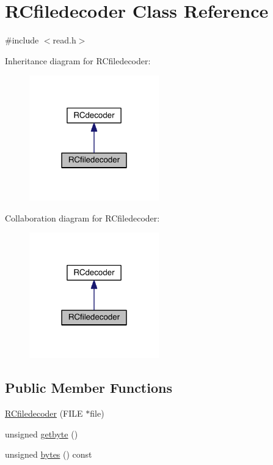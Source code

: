 \hypertarget{class_r_cfiledecoder}{}\section{R\+Cfiledecoder Class Reference}
\label{class_r_cfiledecoder}


{\ttfamily \#include $<$read.\+h$>$}



Inheritance diagram for R\+Cfiledecoder\+:\nopagebreak
\begin{figure}[H]
\begin{center}
\leavevmode
\includegraphics[width=159pt]{d4/dab/class_r_cfiledecoder__inherit__graph}
\end{center}
\end{figure}


Collaboration diagram for R\+Cfiledecoder\+:\nopagebreak
\begin{figure}[H]
\begin{center}
\leavevmode
\includegraphics[width=159pt]{d5/d83/class_r_cfiledecoder__coll__graph}
\end{center}
\end{figure}
\subsection*{Public Member Functions}
\begin{DoxyCompactItemize}
\item 
\hyperlink{class_r_cfiledecoder_a14fcf24c11f896fc5d295e75a7025ecb}{R\+Cfiledecoder} (F\+I\+L\+E $\ast$file)
\item 
unsigned \hyperlink{class_r_cfiledecoder_a65a88a6b3eb058078aa997c4d9785377}{getbyte} ()
\item 
unsigned \hyperlink{class_r_cfiledecoder_af015f1f13806ef6c9feef36856fae1e6}{bytes} () const 
\end{DoxyCompactItemize}
